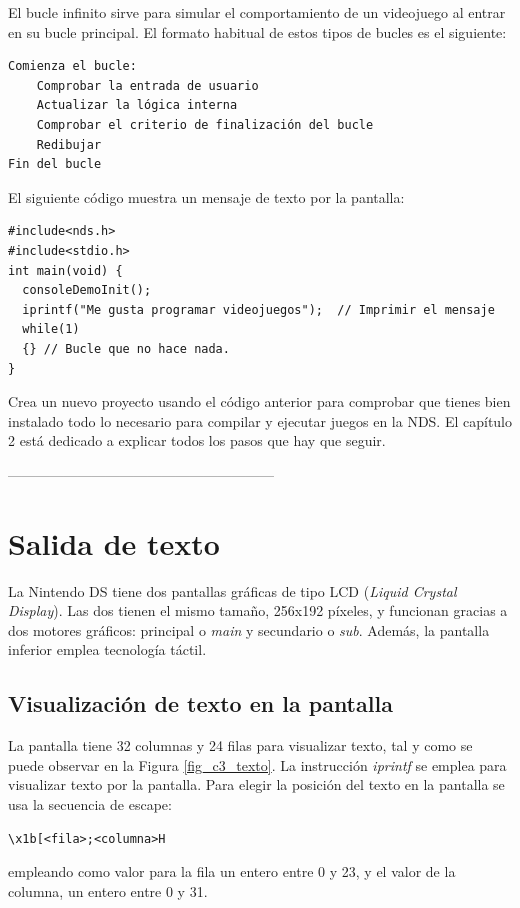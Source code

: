 El bucle infinito sirve para simular el comportamiento de un videojuego al entrar en su bucle principal. El formato habitual de estos tipos de bucles es el siguiente:

\begin{verbatim}
Comienza el bucle:
    Comprobar la entrada de usuario
    Actualizar la lógica interna
    Comprobar el criterio de finalización del bucle
    Redibujar
Fin del bucle
\end{verbatim}



\begin{example}
	El siguiente código muestra un mensaje de texto por la pantalla:
\begin{lstlisting}
#include<nds.h>
#include<stdio.h>
int main(void) {
  consoleDemoInit();
  iprintf("Me gusta programar videojuegos");  // Imprimir el mensaje 
  while(1) 
  {} // Bucle que no hace nada.     
}
\end{lstlisting}
\end{example}


\begin{exercise}
	Crea un nuevo proyecto usando el código anterior para comprobar que tienes bien instalado todo lo necesario para compilar y ejecutar juegos en la NDS. El capítulo 2 está dedicado a explicar todos los pasos que hay que seguir. 
\end{exercise}

 ---------------------------------------------------------
\section{Salida de texto}
La Nintendo DS tiene dos pantallas gráficas de tipo LCD (\textit{Liquid Crystal Display}). Las dos tienen el mismo tamaño, 256x192 píxeles, y funcionan gracias a dos motores gráficos: principal o \textit{main} y secundario o \textit{sub}. Además, la pantalla inferior emplea tecnología táctil.

\subsection{Visualización de texto en la pantalla}
La pantalla tiene 32 columnas y 24 filas para visualizar texto, tal y como se puede observar en la Figura \ref{fig_c3_texto}. La instrucción \textit{iprintf} se emplea para visualizar texto por la pantalla. Para elegir la posición del texto en la pantalla se usa la secuencia de escape:
\begin{verbatim}
\x1b[<fila>;<columna>H
\end{verbatim}
empleando como valor para la fila un entero entre 0 y 23, y el valor de la columna, un entero entre 0 y 31.

